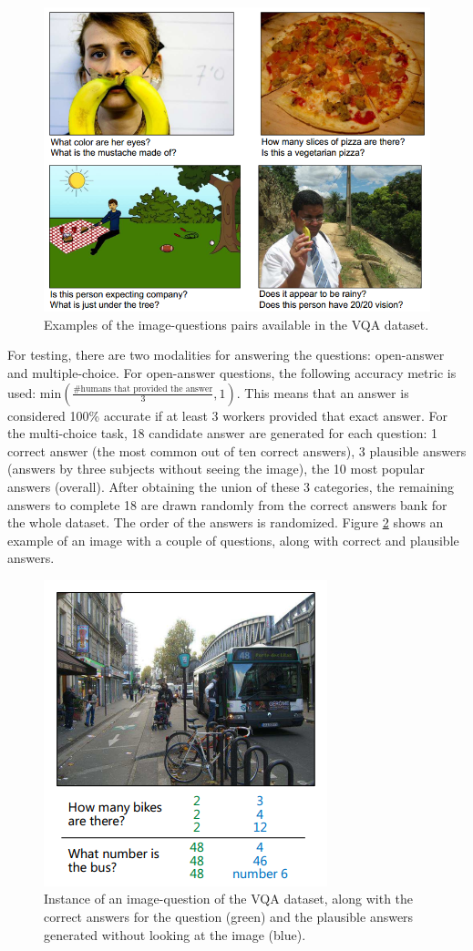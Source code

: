 \documentclass{article}
\begin{document}
    \begin{figure}[ht]
    	\centering
            \includegraphics[width=0.75\linewidth]{questions.PNG}
    	\caption{Examples of the image-questions pairs available in the VQA dataset.}
    	\label{questions}
    \end{figure}
    
For testing, there are two modalities for answering the questions: open-answer and multiple-choice. For open-answer questions, the following accuracy metric is used: min$\left(\frac{\text{\# humans that provided the answer}}{3}, 1\right)$. This means that an answer is considered 100\% accurate if at least 3 workers provided that exact answer. For the multi-choice task, 18 candidate answer are generated for each question: 1 correct answer (the most common out of ten correct answers), 3 plausible answers (answers by three subjects without seeing the image), the 10 most popular answers (overall). After obtaining the union of these 3 categories, the remaining answers to complete 18 are drawn randomly from the correct answers bank for the whole dataset. The order of the answers is randomized. Figure \ref{q+ans} shows an example of an image with a couple of questions, along with correct and plausible answers.

    \begin{figure}[ht]
    	\centering
            \includegraphics[width=0.5\linewidth]{q+ans.PNG}
    	\caption{Instance of an image-question of the VQA dataset, along with the correct answers for the question (green) and the plausible answers generated without looking at the image (blue).}
    	\label{q+ans}
    \end{figure}
 
\end{document}
